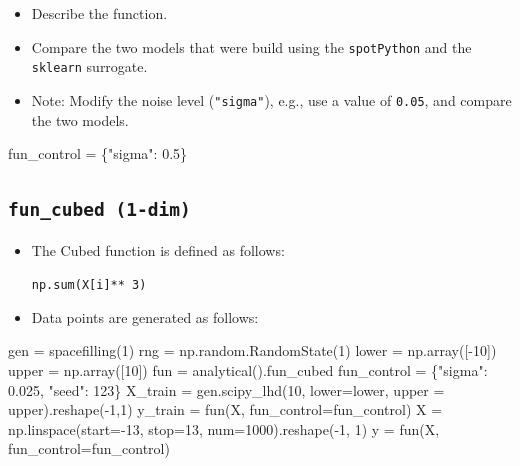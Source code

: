\documentclass[
  letterpaper,
  DIV=11,
  numbers=noendperiod]{scrreprt}
\newenvironment{Shaded}{\begin{snugshade}}{\end{snugshade}}
\newcommand{\DecValTok}[1]{\textcolor[rgb]{0.68,0.00,0.00}{#1}}
\newcommand{\FloatTok}[1]{\textcolor[rgb]{0.68,0.00,0.00}{#1}}
\newcommand{\NormalTok}[1]{\textcolor[rgb]{0.00,0.23,0.31}{#1}}
\newcommand{\OperatorTok}[1]{\textcolor[rgb]{0.37,0.37,0.37}{#1}}
\newcommand{\StringTok}[1]{\textcolor[rgb]{0.13,0.47,0.30}{#1}}
\providecommand{\tightlist}{%
  \setlength{\itemsep}{0pt}\setlength{\parskip}{0pt}}\usepackage{longtable,booktabs,array}
\begin{document}
\begin{itemize}
\tightlist
\item
  Describe the function.
\item
  Compare the two models that were build using the \texttt{spotPython}
  and the \texttt{sklearn} surrogate.
\item
  Note: Modify the noise level (\texttt{"sigma"}), e.g., use a value of
  \texttt{0.05}, and compare the two models.
\end{itemize}

\begin{Shaded}
\begin{Highlighting}[]
\NormalTok{fun\_control }\OperatorTok{=}\NormalTok{ \{}\StringTok{"sigma"}\NormalTok{: }\FloatTok{0.5}\NormalTok{\}}
\end{Highlighting}
\end{Shaded}

\hypertarget{fun_cubed-1-dim}{%
\subsection{\texorpdfstring{\texttt{fun\_cubed\ (1-dim)}}{fun\_cubed (1-dim)}}\label{fun_cubed-1-dim}}

\begin{itemize}
\item
  The Cubed function is defined as follows:

  \texttt{np.sum(X{[}i{]}**\ 3)}
\item
  Data points are generated as follows:
\end{itemize}

\begin{Shaded}
\begin{Highlighting}[]
\NormalTok{gen }\OperatorTok{=}\NormalTok{ spacefilling(}\DecValTok{1}\NormalTok{)}
\NormalTok{rng }\OperatorTok{=}\NormalTok{ np.random.RandomState(}\DecValTok{1}\NormalTok{)}
\NormalTok{lower }\OperatorTok{=}\NormalTok{ np.array([}\OperatorTok{{-}}\DecValTok{10}\NormalTok{])}
\NormalTok{upper }\OperatorTok{=}\NormalTok{ np.array([}\DecValTok{10}\NormalTok{])}
\NormalTok{fun }\OperatorTok{=}\NormalTok{ analytical().fun\_cubed}
\NormalTok{fun\_control }\OperatorTok{=}\NormalTok{ \{}\StringTok{"sigma"}\NormalTok{: }\FloatTok{0.025}\NormalTok{,}
               \StringTok{"seed"}\NormalTok{: }\DecValTok{123}\NormalTok{\}}
\NormalTok{X\_train }\OperatorTok{=}\NormalTok{ gen.scipy\_lhd(}\DecValTok{10}\NormalTok{, lower}\OperatorTok{=}\NormalTok{lower, upper }\OperatorTok{=}\NormalTok{ upper).reshape(}\OperatorTok{{-}}\DecValTok{1}\NormalTok{,}\DecValTok{1}\NormalTok{)}
\NormalTok{y\_train }\OperatorTok{=}\NormalTok{ fun(X, fun\_control}\OperatorTok{=}\NormalTok{fun\_control)}
\NormalTok{X }\OperatorTok{=}\NormalTok{ np.linspace(start}\OperatorTok{={-}}\DecValTok{13}\NormalTok{, stop}\OperatorTok{=}\DecValTok{13}\NormalTok{, num}\OperatorTok{=}\DecValTok{1000}\NormalTok{).reshape(}\OperatorTok{{-}}\DecValTok{1}\NormalTok{, }\DecValTok{1}\NormalTok{)}
\NormalTok{y }\OperatorTok{=}\NormalTok{ fun(X, fun\_control}\OperatorTok{=}\NormalTok{fun\_control)}
\end{Highlighting}
\end{Shaded}
\end{document}
